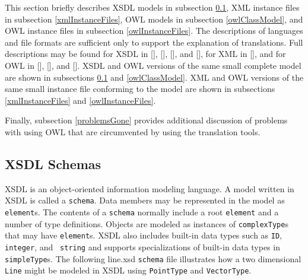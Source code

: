 \documentclass[preprint,12pt]{elsarticle}
\begin{document}
This section briefly describes XSDL models in subsection \ref{xmlSchemas},
XML instance files in subsection \ref{xmlInstanceFiles}, OWL models in
subsection \ref{owlClassModel}, and OWL instance files in subsection
\ref{owlInstanceFiles}. The descriptions of languages and file formats are
sufficient only to support the explanation of translations. Full
descriptions may be found for XSDL in [],
[], [], and [],
for XML in [], and for OWL in [],
[], and []. XSDL and OWL
versions of the same small complete model are shown in subsections
\ref{xmlSchemas} and \ref{owlClassModel}. XML and OWL versions of the same
small instance file conforming to the model are shown in subsections
\ref{xmlInstanceFiles} and \ref{owlInstanceFiles}.

Finally, subsection \ref{problemsGone} provides additional discussion of
problems with using OWL that are circumvented by using the translation
tools.

\subsection{XSDL Schemas}
\label{xmlSchemas}

XSDL is an object-oriented information modeling language. A model written
in XSDL is called a {\tt schema}. Data members may be represented in the
model as {\tt element}s. The contents of a {\tt schema} normally include a
root {\tt element} and a number of type definitions. Objects are modeled as
instances of {\tt complexType}s that may have {\tt element}s. XSDL also
includes built-in data types such as {\tt ID}, {\tt integer}, and {\tt
  string} and supports specializations of built-in data types in {\tt
  simpleType}s. The following line.xsd {\tt schema} file illustrates how a
two dimensional {\tt Line} might be modeled in XSDL using {\tt PointType}
and {\tt VectorType}.
\end{document}
